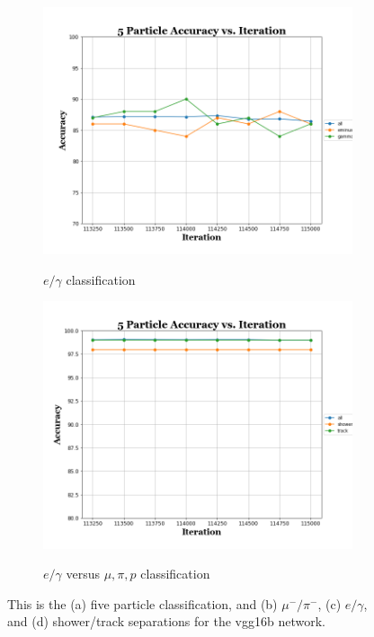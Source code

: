 \documentclass[11pt,a4paper]{article}
\begin{document}
\begin{figure}[t]
\bigskip

\begin{subfigure}[t]{0.45\textwidth}
\centering
\includegraphics[width=\textwidth]{Figures/part_e-gamma_vggb.png}
\label{c}
\caption{$e/\gamma$ classification}
\end{subfigure}%
\hfill
\begin{subfigure}[t]{0.45\textwidth}
\centering
\includegraphics[width=\textwidth]{Figures/part_show-trk_vggb.png}
\label{d}
\caption{$e/\gamma$ versus $\mu,\pi,p$ classification}
\end{subfigure}%
\caption{This is the (a) five particle classification, and (b) $\mu^-/\pi^-$, (c) $e/\gamma$, and (d) shower/track separations for the vgg16b network.}
\label{fig:vgg16b}
\end{figure}
\end{document}
